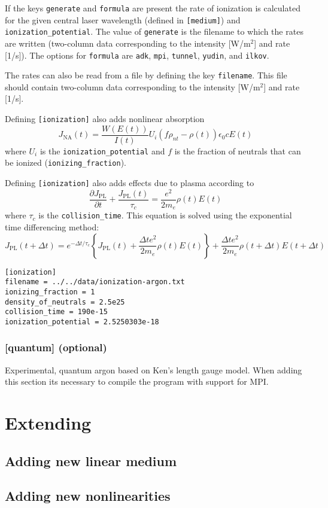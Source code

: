 \documentclass{article}
\begin{document}
If the keys \texttt{generate} and \texttt{formula} are present the
rate of ionization is calculated for the given central laser
wavelength (defined in \texttt{[medium]}) and
\texttt{ionization\_potential}. The value of \texttt{generate} is the
filename to which the rates are written (two-column data corresponding
to the intensity [W/m$^2$] and rate [1/s]). The options for
\texttt{formula} are \texttt{adk}, \texttt{mpi}, \texttt{tunnel},
\texttt{yudin}, and \texttt{ilkov}.

The rates can also be read from a file by defining the key
\texttt{filename}. This file should contain two-column data
corresponding to the intensity [W/m$^2$] and rate [1/s].

Defining \texttt{[ionization]} also adds nonlinear absorption
\[J_{\mathrm{NA}}(t) = \frac{W(E(t))}{I(t)} U_i \left(f\rho_{nt} -
    \rho(t)\right) \epsilon_0 c E(t)\] where $U_i$ is the
\texttt{ionization\_potential} and $f$ is the fraction of neutrals
that can be ionized (\texttt{ionizing\_fraction}).

Defining \texttt{[ionization]} also adds effects due to plasma according to
\[\frac{\partial J_{\mathrm{PL}}}{\partial t} + \frac{J_{\mathrm{PL}}(t)}{\tau_c} = \frac{e^2}{2 m_e} \rho(t) E(t)\]
where $\tau_c$ is the \texttt{collision\_time}. This equation is
solved using the exponential time differencing method:
\[J_{\mathrm{PL}}(t+\Delta t) = e^{-\Delta t/\tau_c}\left\{J_{\mathrm{PL}}(t) + \frac{\Delta t e^2}{2 m_e}\rho(t)E(t)\right\} + \frac{\Delta t e^2}{2 m_e} \rho(t+\Delta t) E(t+\Delta t)\]

\begin{lstlisting}
[ionization]
filename = ../../data/ionization-argon.txt
ionizing_fraction = 1
density_of_neutrals = 2.5e25
collision_time = 190e-15
ionization_potential = 2.5250303e-18
\end{lstlisting}

\subsubsection{[quantum] (optional)}
Experimental, quantum argon based on Ken's length gauge model. When
adding this section its necessary to compile the program with support
for MPI.

\section{Extending}
\subsection{Adding new linear medium}
\subsection{Adding new nonlinearities}
\end{document}
